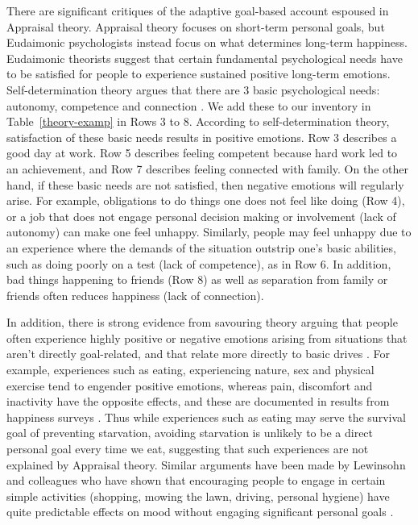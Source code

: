 \documentclass[11pt,letterpaper]{article}
\begin{document}
There are significant critiques of the adaptive goal-based
account espoused in Appraisal theory.  Appraisal theory focuses on
short-term personal goals, but Eudaimonic psychologists instead focus
on what determines long-term happiness.  Eudaimonic theorists
suggest that certain fundamental psychological needs have to be
satisfied for people to experience sustained positive long-term
emotions. Self-determination theory argues that there are 3 basic
psychological needs: {\sc autonomy}, {\sc competence} and {\sc
  connection} \cite{DeciRyan10,RyanDeci00a,Bandura77}.  We add these to our
inventory in Table~\ref{theory-examp} in Rows 3 to 8. According to
self-determination theory, satisfaction of these basic needs results
in positive emotions.  Row 3 describes a good day at work. Row 5
describes feeling competent because hard work led to an achievement,
and Row 7 describes feeling connected with family. On the other hand,
if these basic needs are not satisfied, then negative emotions will
regularly arise. For example, obligations to do things one does not
feel like doing (Row 4), or a job that does not engage personal
decision making or involvement (lack of autonomy) can make one feel
unhappy. Similarly, people may feel unhappy due to an experience where
the demands of the situation outstrip one's basic abilities, such as
doing poorly on a test (lack of competence), as in Row 6.  In
addition, bad things happening to friends (Row 8) as well as
separation from family or friends often reduces happiness (lack of
connection).

In addition, there is strong evidence from {\sc savouring} theory
\cite{Joseetal12,bryant2011understanding} arguing that people often
experience highly positive or negative emotions arising from
situations that aren't directly goal-related, and that relate more
directly to basic drives \cite{maslow1943theory,Elson-Thesis12}. For
example, experiences such as eating, experiencing nature, sex and
physical exercise tend to engender positive emotions, whereas pain,
discomfort and inactivity have the opposite effects, and these are
documented in results from happiness surveys
\cite{Kahnemanetal04,Seligmanetal06}.  Thus while experiences such as
eating may serve the survival goal of preventing starvation, avoiding
starvation is unlikely to be a direct personal goal every time we eat,
suggesting that such experiences are not explained by Appraisal
theory. Similar arguments have been made by Lewinsohn and colleagues
who have shown that encouraging people to engage in certain simple
activities (shopping, mowing the lawn, driving, personal hygiene) have
quite predictable effects on mood without engaging significant
personal goals
\cite{macphillamy1982pleasant,Lewinsohnetal85,Lewinsohnetal78}.
\end{document}
